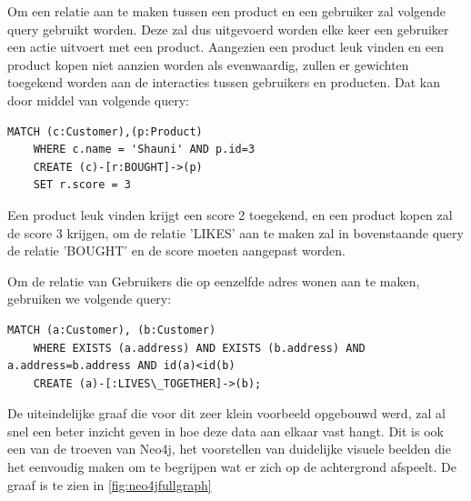 Om een relatie aan te maken tussen een product en een gebruiker zal volgende query gebruikt worden. Deze zal dus uitgevoerd worden elke keer een gebruiker een actie uitvoert met een product.
Aangezien een product leuk vinden en een product kopen niet aanzien worden als evenwaardig, zullen er gewichten toegekend worden aan de interacties tussen gebruikers en producten.  Dat kan door middel van volgende query:

\begin{lstlisting}[caption={Neo4j query voor het aanmaken van een relatie tussen een product en een klant}]
	MATCH (c:Customer),(p:Product) 
	WHERE c.name = 'Shauni' AND p.id=3 
	CREATE (c)-[r:BOUGHT]->(p) 
	SET r.score = 3
\end{lstlisting}

Een product leuk vinden krijgt een score 2 toegekend, en een product kopen zal de score 3 krijgen, om de relatie 'LIKES' aan te maken zal in bovenstaande query de relatie 'BOUGHT' en de score moeten aangepast worden.

Om de relatie van Gebruikers die op eenzelfde adres wonen aan te maken, gebruiken we volgende query: 

\begin{lstlisting}[caption={Neo4j query voor het aanmaken van een relatie tussen een twee klanten.}]
	MATCH (a:Customer), (b:Customer) 
	WHERE EXISTS (a.address) AND EXISTS (b.address) AND a.address=b.address AND id(a)<id(b) 
	CREATE (a)-[:LIVES\_TOGETHER]->(b); 
\end{lstlisting}

De uiteindelijke graaf die voor dit zeer klein voorbeeld opgebouwd werd, zal al snel een beter inzicht geven in hoe deze data aan elkaar vast hangt. Dit is ook een van de troeven van Neo4j, het voorstellen van duidelijke visuele beelden die het eenvoudig maken om te begrijpen wat er zich op de achtergrond afspeelt. De graaf is te zien in \autoref{fig:neo4jfullgraph}
\newpage

